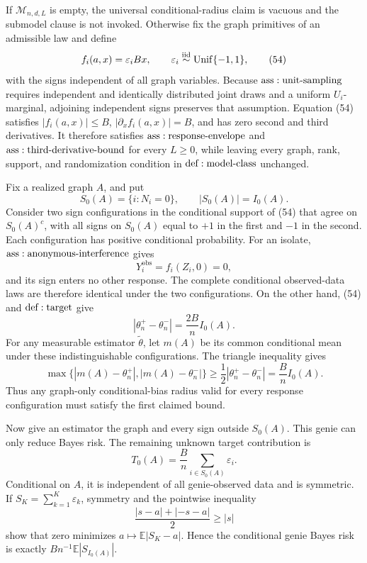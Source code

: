 If \(\mathcal M_{n,d,L}\) is empty, the universal conditional-radius claim is vacuous and the submodel clause is not invoked.  Otherwise fix the graph primitives of an admissible law and define
\[
 f_i(a,x)=\varepsilon_iBx,
 \qquad
 \varepsilon_i\overset{\mathrm{iid}}{\sim}{\rm Unif}\{-1,1\},
\tag{54}
\]
with the signs independent of all graph variables.  Because \({\rm ass:unit\text{-}sampling}\) requires independent and identically distributed joint draws and a uniform \(U_i\)-marginal, adjoining independent signs preserves that assumption.  Equation (54) satisfies \(|f_i(a,x)|\leq B\), \(|\partial_xf_i(a,x)|=B\), and has zero second and third derivatives.  It therefore satisfies \({\rm ass:response\text{-}envelope}\) and \({\rm ass:third\text{-}derivative\text{-}bound}\) for every \(L\geq0\), while leaving every graph, rank, support, and randomization condition in \({\rm def:model\text{-}class}\) unchanged.

Fix a realized graph \(A\), and put
\[
 S_0(A)=\{i:N_i=0\},
 \qquad |S_0(A)|=I_0(A).
\tag{55}
\]
Consider two sign configurations in the conditional support of (54) that agree on \(S_0(A)^c\), with all signs on \(S_0(A)\) equal to \(+1\) in the first and \(-1\) in the second.  Each configuration has positive conditional probability.  For an isolate, \({\rm ass:anonymous\text{-}interference}\) gives
\[
 Y_i^{\mathrm{obs}}=f_i(Z_i,0)=0,
\tag{56}
\]
and its sign enters no other response.  The complete conditional observed-data laws are therefore identical under the two configurations.  On the other hand, (54) and \({\rm def:target}\) give
\[
 |\theta_n^+-\theta_n^-|=\frac{2B}{n}I_0(A).
\tag{57}
\]
For any measurable estimator \(\widetilde\theta\), let \(m(A)\) be its common conditional mean under these indistinguishable configurations.  The triangle inequality gives
\[
 \max\{|m(A)-\theta_n^+|,|m(A)-\theta_n^-|\}
 \geq\frac12|\theta_n^+-\theta_n^-|
 =\frac BnI_0(A).
\tag{58}
\]
Thus any graph-only conditional-bias radius valid for every response configuration must satisfy the first claimed bound.

Now give an estimator the graph and every sign outside \(S_0(A)\).  This genie can only reduce Bayes risk.  The remaining unknown target contribution is
\[
 T_0(A)=\frac Bn\sum_{i\in S_0(A)}\varepsilon_i.
\tag{59}
\]
Conditional on \(A\), it is independent of all genie-observed data and is symmetric.  If \(S_K=\sum_{k=1}^K\varepsilon_k\), symmetry and the pointwise inequality
\[
 \frac{|s-a|+|-s-a|}{2}\geq |s|
\tag{60}
\]
show that zero minimizes \(a\mapsto\mathbb E|S_K-a|\).  Hence the conditional genie Bayes risk is exactly \(Bn^{-1}\mathbb E|S_{I_0(A)}|\).


